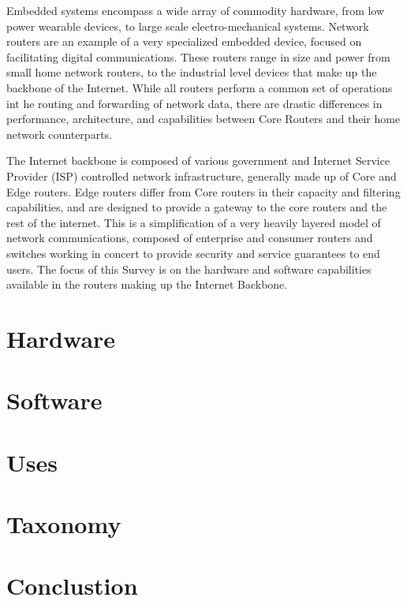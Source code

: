 Embedded systems encompass a wide array of commodity hardware, from low power wearable devices, to large scale electro-mechanical systems. Network routers are an example of a very specialized embedded device, focused on facilitating digital communications. These routers range in size and power from small home network routers, to the industrial level devices that make up the backbone of the Internet. While all routers perform a common set of operations int he routing and forwarding of network data, there are drastic differences in performance, architecture, and capabilities between Core Routers and their home network counterparts.

The Internet backbone is composed of various government and Internet Service Provider (ISP) controlled network infrastructure, generally made up of Core and Edge routers. Edge routers differ from Core routers in their capacity and filtering capabilities, and are designed to provide a gateway to the core routers and the rest of the internet. This is a simplification of a very heavily layered model of network communications, composed of enterprise and consumer routers and switches working in concert to provide security and service guarantees to end users. The focus of this Survey is on the hardware and software capabilities available in the routers making up the Internet Backbone.


\section{Hardware}

\section{Software}

\section{Uses}


\section{Taxonomy}

\section{Conclustion}

